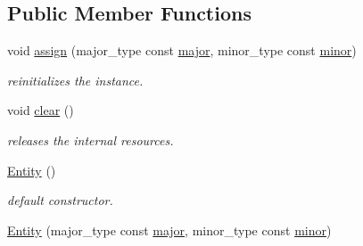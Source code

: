 \subsection*{Public Member Functions}
\begin{DoxyCompactItemize}
\item 
\hypertarget{classhryky_1_1http_1_1version_1_1_entity_a4ef617b2be607c93770c82e6d3a02820}{void \hyperlink{classhryky_1_1http_1_1version_1_1_entity_a4ef617b2be607c93770c82e6d3a02820}{assign} (major\-\_\-type const \hyperlink{classhryky_1_1http_1_1version_1_1_entity_ac64b377083289ff986525ddba6f8d96b}{major}, minor\-\_\-type const \hyperlink{classhryky_1_1http_1_1version_1_1_entity_acdc34bd9d3ceac4971d12058cba3b336}{minor})}\label{classhryky_1_1http_1_1version_1_1_entity_a4ef617b2be607c93770c82e6d3a02820}

\begin{DoxyCompactList}\small\item\em reinitializes the instance. \end{DoxyCompactList}\item 
\hypertarget{classhryky_1_1http_1_1version_1_1_entity_a0863b378f7a8bd4eb706ef353246ebe6}{void \hyperlink{classhryky_1_1http_1_1version_1_1_entity_a0863b378f7a8bd4eb706ef353246ebe6}{clear} ()}\label{classhryky_1_1http_1_1version_1_1_entity_a0863b378f7a8bd4eb706ef353246ebe6}

\begin{DoxyCompactList}\small\item\em releases the internal resources. \end{DoxyCompactList}\item 
\hypertarget{classhryky_1_1http_1_1version_1_1_entity_ac19b58d9064e89114e8d3fa85ffdb3ba}{\hyperlink{classhryky_1_1http_1_1version_1_1_entity_ac19b58d9064e89114e8d3fa85ffdb3ba}{Entity} ()}\label{classhryky_1_1http_1_1version_1_1_entity_ac19b58d9064e89114e8d3fa85ffdb3ba}

\begin{DoxyCompactList}\small\item\em default constructor. \end{DoxyCompactList}\item 
\hypertarget{classhryky_1_1http_1_1version_1_1_entity_a04fa5d2fe8beabc031e6a53998662653}{\hyperlink{classhryky_1_1http_1_1version_1_1_entity_a04fa5d2fe8beabc031e6a53998662653}{Entity} (major\-\_\-type const \hyperlink{classhryky_1_1http_1_1version_1_1_entity_ac64b377083289ff986525ddba6f8d96b}{major}, minor\-\_\-type const \hyperlink{classhryky_1_1http_1_1version_1_1_entity_acdc34bd9d3ceac4971d12058cba3b336}{minor})}\label{classhryky_1_1http_1_1version_1_1_entity_a04fa5d2fe8beabc031e6a53998662653}


\end{DoxyCompactItemize}

